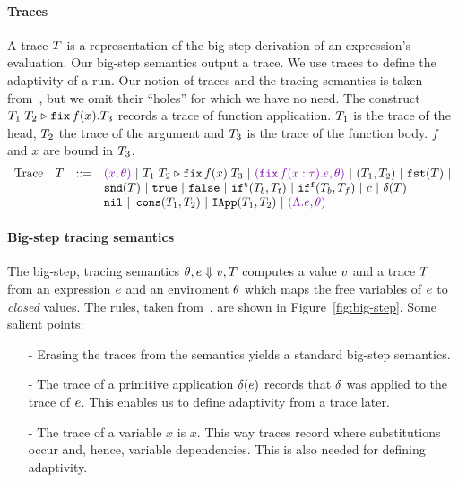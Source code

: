 \documentclass[a4paper,11pt]{article}
\newcommand{\wq}[1]{\textcolor[rgb]{.50,0.0,0.7}{ #1}}
\theoremstyle{definition}
\begin{document}
\paragraph{Traces}
A trace $T$ is a representation of the big-step derivation of an
expression's evaluation. Our big-step semantics output a trace. We use
traces to define the adaptivity of a run. Our notion of traces and the
tracing semantics is taken from~\cite[Section 4]{perera:dep}, but we
omit their ``holes'' for which we have no need. The construct
$T_1 \; T_2 \mathrel{\triangleright} {\mathop{\mathtt{fix}} f(x).T_3}$ records a trace of function
application. $T_1$ is the trace of the head, $T_2$ the trace of
the argument and $T_3$ is the trace of the function body. $f$ and
$x$ are bound in $T_3$.
%
\[\begin{array}{llll}
\mbox{Trace} & \tr & ::= & \wq{(x, \env)} ~|~ \trapp{\tr_1}{\tr_2}{f}{x}{\tr_3} ~|~
\wq{ (\trfix f(x:\type).e, \env) } ~|~ (\tr_1, \tr_2) ~|~ \trprojl(\tr) ~|\\ 
%
& & & \trprojr(\tr) ~|~ \trtrue ~|~ \trfalse ~|~ \trift(\tr_b, \tr_t)
~|~ \triff(\tr_b, \tr_f) ~|~ \trconst ~|~ \trop(\tr) \\
%
& & & \trnil ~|~ \trcons (\tr_1, \tr_2) ~|~ \triapp{\tr_1}{\tr_2} ~|~
      \wq {(\eilam \expr, \env)}
\end{array}\]


\paragraph{Big-step tracing semantics}
The big-step, tracing semantics $\theta, e \mathrel{\Downarrow} v, T$
computes a value $v$ and a trace $T$ from an expression $e$
and an enviroment $\theta$ which maps the free variables of $e$ to
\emph{closed} values. The rules, taken from~\cite{perera:dep}, are
shown in Figure~\ref{fig:big-step}. Some salient points:
\begin{itemize}
\item[-] Erasing the traces from the semantics yields a standard
  big-step semantics.
\item[-] The trace of a primitive application $\delta(e)$
  records that $\delta$ was applied to the trace of
  $e$. This enables us to define adaptivity from a trace later.
\item[-] The trace of a variable $x$ is $x$. This way traces record
  where substitutions occur and, hence, variable dependencies. This is
  also needed for defining adaptivity.
\end{itemize}
\end{document}
